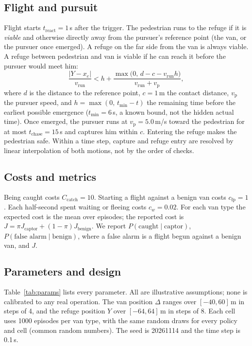 \documentclass[11pt,a4paper]{article}
\begin{document}
\subsection{Flight and pursuit}
Flight starts $t_{\mathrm{react}}=1$\,s after the trigger. The pedestrian runs to the refuge if it is \emph{viable} and otherwise directly away from the pursuer's reference point (the van, or the pursuer once emerged). A refuge on the far side from the van is always viable. A refuge between pedestrian and van is viable if he can reach it before the pursuer would meet him:
\begin{equation}
  \frac{|Y-x_e|}{v_{\mathrm{run}}} < h + \frac{\max\bigl(0,\,d-c-v_{\mathrm{run}}h\bigr)}{v_{\mathrm{run}}+v_{\mathrm{p}}},
  \label{eq:viable}
\end{equation}
where $d$ is the distance to the reference point, $c=1$\,m the contact distance, $v_{\mathrm{p}}$ the pursuer speed, and $h=\max(0,\,t_{\min}-t)$ the remaining time before the earliest possible emergence ($t_{\min}=6$\,s, a known bound, not the hidden actual time). Once emerged, the pursuer runs at $v_{\mathrm{p}}=5.0$\,m/s toward the pedestrian for at most $t_{\mathrm{chase}}=15$\,s and captures him within $c$. Entering the refuge makes the pedestrian safe. Within a time step, capture and refuge entry are resolved by linear interpolation of both motions, not by the order of checks.

\subsection{Costs and metrics}\label{sec:costs}
Being caught costs $C_{\mathrm{catch}}=10$. Starting a flight against a benign van costs $c_{\mathrm{fp}}=1$. Each half-second spent waiting or fleeing costs $c_w=0.02$. For each van type the expected cost is the mean over episodes; the reported cost is $J=\pi J_{\text{captor}}+(1-\pi)J_{\text{benign}}$. We report $P(\text{caught}\mid\text{captor})$, $P(\text{false alarm}\mid\text{benign})$, where a false alarm is a flight begun against a benign van, and $J$.

\subsection{Parameters and design}
Table~\ref{tab:params} lists every parameter. All are illustrative assumptions; none is calibrated to any real operation. The van position $\Delta$ ranges over $[-40,60]$\,m in steps of 4, and the refuge position $Y$ over $[-64,64]$\,m in steps of 8. Each cell uses 1000 episodes per van type, with the same random draws for every policy and cell (common random numbers). The seed is 20261114 and the time step is 0.1\,s.
\end{document}
